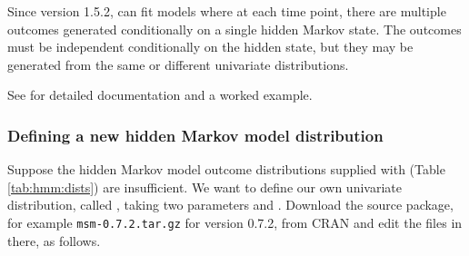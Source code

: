 Since version 1.5.2,  can fit models where at each time
point, there are multiple outcomes generated conditionally on a single
hidden Markov state.  The outcomes must be independent conditionally
on the hidden state, but they may be generated from the same or
different univariate distributions.

See  for detailed documentation and a worked
example.



\subsubsection{Defining a new hidden Markov model distribution}

Suppose the hidden Markov model outcome distributions supplied with
 (Table \ref{tab:hmm:dists}) are insufficient.  We want
to define our own univariate distribution, called
, taking two parameters  and
.  Download the source package, for example
\texttt{msm-0.7.2.tar.gz} for version 0.7.2, from CRAN and edit the
files in there, as follows.

